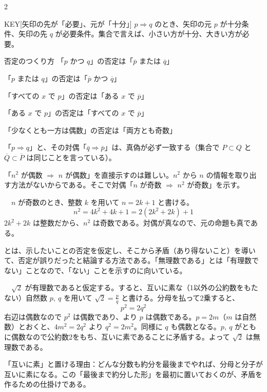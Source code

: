 \documentclass[paper=b5j, fontsize=8pt, fleqn, twoside]{jlreq}
\begin{document}
\begin{multicols*}{2}
  \begin{ptbs}{KEY}[矢印の先が「必要」、元が「十分」]
    $p\Rightarrow q$ のとき、矢印の元 $p$ が十分条件、矢印の先 $q$ が必要条件。集合で言えば、小さい方が十分、大きい方が必要。
  \end{ptbs}

  \begin{koushiki}{否定のつくり方}
    「$p$ かつ $q$」の否定は「$\overline p$ または $\overline q$」\par
    「$p$ または $q$」の否定は「$\overline p$ かつ $\overline q$」\par
    「すべての $x$ で $p$」の否定は「ある $x$ で $\overline p$」\par
    「ある $x$ で $p$」の否定は「すべての $x$ で $\overline p$」\par
    「少なくとも一方は偶数」の否定は「両方とも奇数」
  \end{koushiki}

  「$p\Rightarrow q$」と、その対偶「$\overline q\Rightarrow\overline p$」は、真偽が必ず一致する（集合で $P\subset Q$ と $\overline Q\subset\overline P$ は同じことを言っている）。\par
  「$n^2$ が偶数 $\Rightarrow$ $n$ が偶数」を直接示すのは難しい。$n^2$ から $n$ の情報を取り出す方法がないからである。そこで対偶「$n$ が奇数 $\Rightarrow$ $n^2$ が奇数」を示す。

  　$n$ が奇数のとき、整数 $k$ を用いて $n=2k+1$ と書ける。
  \[n^2=4k^2+4k+1=2(2k^2+2k)+1\]
  $2k^2+2k$ は整数だから、$n^2$ は奇数である。対偶が真なので、元の命題も真である。\QED

  とは、示したいことの否定を仮定し、そこから矛盾（あり得ないこと）を導いて、否定が誤りだったと結論する方法である。「無理数である」とは「有理数でない」ことなので、「ない」ことを示すのに向いている。

  　$\sqrt2$ が有理数であると仮定する。すると、互いに素な（1以外の公約数をもたない）自然数 $p,\ q$ を用いて $\sqrt2=\frac pq$ と書ける。分母を払って2乗すると、
  \[p^2=2q^2\]
  右辺は偶数なので $p^2$ は偶数であり、より $p$ は偶数である。$p=2m$（$m$ は自然数）とおくと、$4m^2=2q^2$ より $q^2=2m^2$。同様に $q$ も偶数となる。$p,\ q$ がともに偶数なので公約数2をもち、互いに素であることに矛盾する。よって $\sqrt2$ は無理数である。\QED

  \begin{memo}
    「互いに素」と置ける理由：どんな分数も約分を最後までやれば、分母と分子が互いに素になる。この「最後まで約分した形」を最初に置いておくのが、矛盾を作るための仕掛けである。
  \end{memo}


\end{multicols*}
\end{document}
